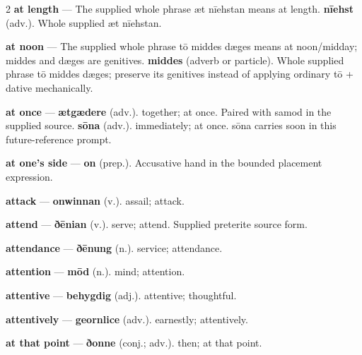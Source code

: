 \begin{multicols}{2}
\textbf{at length} — The supplied whole phrase æt nīehstan means at length. \textbf{nīehst} (adv.). Whole supplied æt nīehstan.\par
\textbf{at noon} — The supplied whole phrase tō middes dæges means at noon/midday; middes and dæges are genitives. \textbf{middes} (adverb or particle). Whole supplied phrase tō middes dæges; preserve its genitives instead of applying ordinary tō + dative mechanically.\par
\textbf{at once} — \textbf{ætgædere} (adv.). together; at once. Paired with samod in the supplied source. \textbf{sōna} (adv.). immediately; at once. sōna carries soon in this future-reference prompt.\par
\textbf{at one's side} — \textbf{on} (prep.). Accusative hand in the bounded placement expression.\par
\textbf{attack} — \textbf{onwinnan} (v.). assail; attack.\par
\textbf{attend} — \textbf{ðēnian} (v.). serve; attend. Supplied preterite source form.\par
\textbf{attendance} — \textbf{ðēnung} (n.). service; attendance.\par
\textbf{attention} — \textbf{mōd} (n.). mind; attention.\par
\textbf{attentive} — \textbf{behygdig} (adj.). attentive; thoughtful.\par
\textbf{attentively} — \textbf{geornlice} (adv.). earnestly; attentively.\par
\textbf{at that point} — \textbf{ðonne} (conj.; adv.). then; at that point.\par

\end{multicols}
